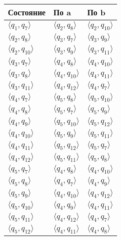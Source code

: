 \documentclass{article}
\begin{document}
\begin{enumerate}
            \begin{tabular} { | l | l | l | }
                \hline 
                Состояние & По a & По b \\ \hline
                \(\langle q_1, q_7\rangle\) & \(\langle q_2, q_8\rangle\) & \(\langle q_2, q_{10}\rangle\) \\ \hline
                \(\langle q_2, q_8\rangle\) & \(\langle q_3, q_7\rangle\) & \(\langle q_3, q_9\rangle\) \\ \hline
                \(\langle q_2, q_{10}\rangle\) & \(\langle q_3, q_9\rangle\) & \(\langle q_3, q_{11}\rangle\) \\ \hline
                \(\langle q_3, q_7\rangle\) & \(\langle q_4, q_8\rangle\) & \(\langle q_4, q_{10}\rangle\) \\ \hline
                \(\langle q_3, q_8\rangle\) & \(\langle q_4, q_{10}\rangle\) & \(\langle q_4, q_{11}\rangle\) \\ \hline
                \(\langle q_3, q_{11}\rangle\) & \(\langle q_4, q_{12}\rangle\) & \(\langle q_4, q_7\rangle\) \\ \hline
                \(\langle q_4, q_7 \rangle\) & \(\langle q_5, q_8\rangle\) & \(\langle q_5, q_{10}\rangle\) \\ \hline
                \(\langle q_4, q_8\rangle\) & \(\langle q_5, q_7\rangle\) & \(\langle q_5, q_9\rangle\) \\ \hline
                \(\langle q_4, q_9\rangle\) & \(\langle q_5, q_{10}\rangle\) & \(\langle q_5, q_{12}\rangle\) \\ \hline
                \(\langle q_4, q_{10}\rangle\) & \(\langle q_5, q_9\rangle\) & \(\langle q_5, q_{11}\rangle\) \\ \hline
                \(\langle q_4, q_{11}\rangle\) & \(\langle q_5, q_{12}\rangle\) & \(\langle q_5, q_7\rangle\) \\ \hline
                \(\langle q_4, q_{12}\rangle\) & \(\langle q_5, q_{11}\rangle\) & \(\langle q_5, q_8\rangle\) \\ \hline
                \(\langle q_5, q_7\rangle\) & \(\langle q_4, q_8\rangle\) & \(\langle q_4, q_{10}\rangle\) \\ \hline
                \(\langle q_5, q_8\rangle\) & \(\langle q_4, q_7\rangle\) & \(\langle q_4, q_9\rangle\) \\ \hline
                \(\langle q_5, q_9\rangle\) & \(\langle q_4, q_{10}\rangle\) & \(\langle q_4, q_{12}\rangle\) \\ \hline
                \(\langle q_5, q_{10}\rangle\) & \(\langle q_4, q_9\rangle\) & \(\langle q_4, q_{11}\rangle\) \\ \hline
                \(\langle q_5, q_{11}\rangle\) & \(\langle q_4, q_{12}\rangle\) & \(\langle q_4, q_7\rangle\) \\ \hline
                \(\langle q_5, q_{12}\rangle\) & \(\langle q_4, q_{11}\rangle\) & \(\langle q_4, q_8\rangle\) \\
                \hline
            \end{tabular} \\
            

\end{enumerate}
\end{document}
